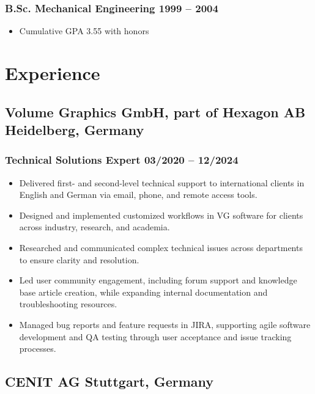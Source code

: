 \documentclass[11pt]{article} %
\begin{document}
	\subsubsection{B.Sc. Mechanical Engineering \hfill 1999 – 2004}
	\begin{itemize}[itemsep=4pt, topsep=2pt, left=1em]
		\item Cumulative GPA 3.55 with honors
	\end{itemize}
	
	\section{Experience}
	\vspace{-1.5ex}
	\subsection{Volume Graphics GmbH, part of Hexagon AB \hfill Heidelberg, Germany}
	\subsubsection{Technical Solutions Expert \hfill  03/2020 – 12/2024}
	\begin{itemize}[itemsep=4pt, topsep=2pt, left=1em]
		\item Delivered first- and second-level technical support to international clients in English and German via email, phone, and remote access tools.
		\item Designed and implemented customized workflows in VG software for clients across industry, research, and academia.
		\item Researched and communicated complex technical issues across departments to ensure clarity and resolution.
		\item Led user community engagement, including forum support and knowledge base article creation, while expanding internal documentation and troubleshooting resources.
		\item Managed bug reports and feature requests in JIRA, supporting agile software development and QA testing through user acceptance and issue tracking processes.       
	\end{itemize}
	
	\subsection{CENIT AG \hfill Stuttgart, Germany}
\end{document}
